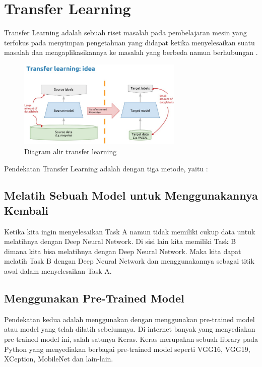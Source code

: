\section{Transfer Learning}
\par Transfer Learning adalah sebuah riset masalah pada pembelajaran mesin yang terfokus pada menyimpan pengetahuan yang didapat ketika menyelesaikan suatu masalah dan mengaplikasikannya ke masalah yang berbeda namun berhubungan \cite{transfer_def}. 
\begin{figure}[!ht]
	\centering\includegraphics[width=0.7\textwidth]{bab2/figures/transfer-works.png}
	\caption{Diagram alir transfer learning\cite{transfer_pic}}
	\label{fig:transfer-works}
\end{figure}
\par Pendekatan Transfer Learning adalah dengan tiga metode, yaitu : 

\subsection{Melatih Sebuah Model untuk Menggunakannya Kembali}
\par Ketika kita ingin menyelesaikan Task A namun tidak memiliki cukup data untuk melatihnya dengan Deep Neural Network. Di sisi lain kita memiliki Task B dimana kita bisa melatihnya dengan Deep Neural Network. Maka kita dapat melatih Task B dengan Deep Neural Network dan menggunakannya sebagai titik awal dalam menyelesaikan Task A.

\subsection{Menggunakan Pre-Trained Model}
\par Pendekatan kedua adalah menggunakan dengan menggunakan pre-trained model atau model yang telah dilatih sebelumnya. Di internet banyak yang menyediakan pre-trained model ini, salah satunya Keras. Keras merupakan sebuah library pada Python yang menyediakan berbagai pre-trained model seperti VGG16, VGG19, XCeption, MobileNet dan lain-lain. 

